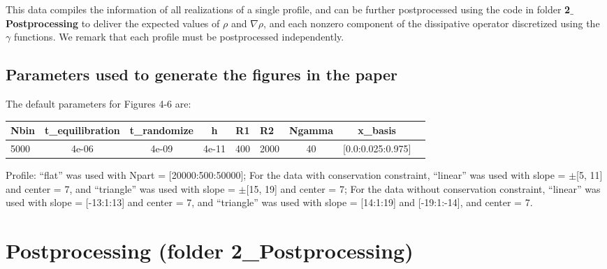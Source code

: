 \documentclass[authoryear,3p,11pt]{elsarticle}
\begin{document}
This data compiles the information of all realizations of a single profile, and can be further postprocessed using the code in folder {\bf 2$\_$Postprocessing} to deliver the expected values of $\rho$ and $\nabla \rho$, and each nonzero component of the dissipative operator discretized using the $\gamma$ functions. We remark that each profile must be postprocessed independently.

\subsection{Parameters used to generate the figures in the paper}

The default parameters for Figures 4-6 are:
\begin{center}
\begin{tabular}{  | l |c|c|c|c|l|c|c|c|}
\hline
Nbin &t\_equilibration &t\_randomize &h &R1 &R2 &Ngamma &x\_basis \\
\hline
5000	&4e-06	&4e-09	&4e-11	&400	&2000	&40	&[0.0:0.025:0.975] \\
\hline
\end{tabular}
\end{center}

Profile: ``flat'' was used with Npart = [20000:500:50000]; For the data with conservation constraint, ``linear'' was used with slope = $\pm$[5, 11] and center = 7,  and ``triangle''  was used with slope = $\pm$[15, 19] and center = 7; For the data without conservation constraint, ``linear'' was used with slope = [-13:1:13] and center = 7, and ``triangle'' was used with slope = [14:1:19] and [-19:1:-14], and center = 7.


\section{Postprocessing (folder 2\_Postprocessing)} \label{Sec:Postprocessing}
\end{document}
